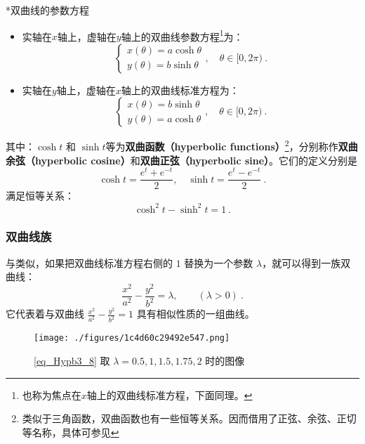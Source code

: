 \begin{theorem}{*双曲线的参数方程}
\begin{itemize}
\item 实轴在$x$轴上，虚轴在$y$轴上的双曲线参数方程\footnote{也称为焦点在$x$轴上的双曲线标准方程，下面同理。}为：
\begin{equation}
\begin{cases}
x(\theta) = a \cosh \theta\\
y(\theta) = b \sinh \theta
\end{cases},\quad \theta \in [0, 2\pi) ~.
\end{equation}
\item 实轴在$y$轴上，虚轴在$x$轴上的双曲线标准方程为：
\begin{equation}
\begin{cases}
x(\theta) = b \sinh \theta\\
y(\theta) = a \cosh \theta
\end{cases},\quad \theta \in [0, 2\pi) ~.
\end{equation}
\end{itemize}
其中：$\cosh t$ 和 $\sinh t$等为\textbf{双曲函数（hyperbolic functions）}\footnote{类似于三角函数，双曲函数也有一些恒等关系。因而借用了正弦、余弦、正切等名称，具体可参见}，分别称作\textbf{双曲余弦（hyperbolic cosine）}和\textbf{双曲正弦（hyperbolic sine）}。它们的定义分别是
\begin{equation}
\cosh t = \frac{e^t + e^{-t}}{2}, \quad \sinh t = \frac{e^t - e^{-t}}{2}~.
\end{equation}
满足恒等关系：
\begin{equation}
\cosh^2 t - \sinh^2 t = 1~.
\end{equation}
\end{theorem}


\subsubsection{双曲线族}

与类似，如果把双曲线标准方程右侧的 $1$ 替换为一个参数 $\lambda$，就可以得到一族双曲线：
\begin{equation}\label{eq_Hypb3_8}
\frac{x^2}{a^2} - \frac{y^2}{b^2} = \lambda,\qquad(\lambda>0)~.
\end{equation}
它代表着与双曲线 $\displaystyle\frac{x^2}{a^2} - \frac{y^2}{b^2} = 1$ 具有相似性质的一组曲线。

\begin{figure}[ht]
\centering
\texttt{[image: ./figures/1c4d60c29492e547.png]}
\caption{\autoref{eq_Hypb3_8} 取 $\lambda=0.5,1,1.5,1.75,2$ 时的图像} \label{fig_Hypb3_5}
\end{figure}

